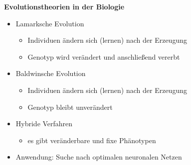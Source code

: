 %
\textbf{Evolutionstheorien in der Biologie}
\begin{itemize}
	\item Lamarksche Evolution
	\begin{itemize}
		\item Individuen ändern sich (lernen) nach der Erzeugung
		\item Genotyp wird verändert und anschließend vererbt
	\end{itemize}
	\item Baldwinsche Evolution
	\begin{itemize}
		\item Individuen ändern sich (lernen) nach der Erzeugung
		\item Genotyp bleibt unverändert
	\end{itemize}
	\item Hybride Verfahren
	\begin{itemize}
		\item es gibt veränderbare und fixe Phänotypen
	\end{itemize}
	\item Anwendung: Suche nach optimalen neuronalen Netzen
\end{itemize}

